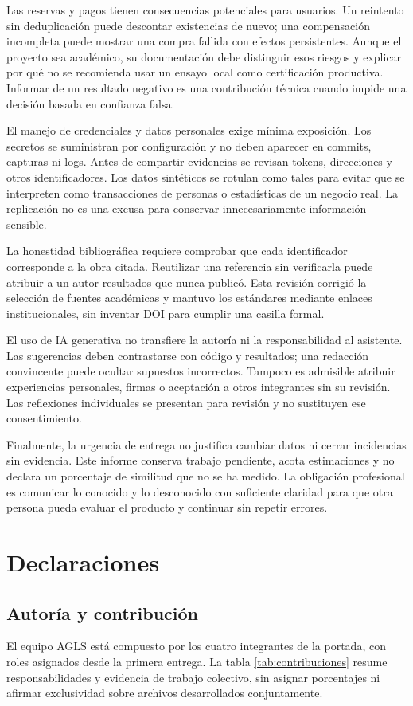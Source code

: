 \documentclass[12pt,a4paper]{article}
\newcommand{\seccion}[1]{\section{#1}}
\begin{document}
Las reservas y pagos tienen consecuencias potenciales para usuarios. Un reintento sin deduplicación puede descontar existencias de nuevo; una compensación incompleta puede mostrar una compra fallida con efectos persistentes. Aunque el proyecto sea académico, su documentación debe distinguir esos riesgos y explicar por qué no se recomienda usar un ensayo local como certificación productiva. Informar de un resultado negativo es una contribución técnica cuando impide una decisión basada en confianza falsa.

El manejo de credenciales y datos personales exige mínima exposición. Los secretos se suministran por configuración y no deben aparecer en commits, capturas ni logs. Antes de compartir evidencias se revisan tokens, direcciones y otros identificadores. Los datos sintéticos se rotulan como tales para evitar que se interpreten como transacciones de personas o estadísticas de un negocio real. La replicación no es una excusa para conservar innecesariamente información sensible.

La honestidad bibliográfica requiere comprobar que cada identificador corresponde a la obra citada. Reutilizar una referencia sin verificarla puede atribuir a un autor resultados que nunca publicó. Esta revisión corrigió la selección de fuentes académicas y mantuvo los estándares mediante enlaces institucionales, sin inventar DOI para cumplir una casilla formal.

El uso de IA generativa no transfiere la autoría ni la responsabilidad al asistente. Las sugerencias deben contrastarse con código y resultados; una redacción convincente puede ocultar supuestos incorrectos. Tampoco es admisible atribuir experiencias personales, firmas o aceptación a otros integrantes sin su revisión. Las reflexiones individuales se presentan para revisión y no sustituyen ese consentimiento.

Finalmente, la urgencia de entrega no justifica cambiar datos ni cerrar incidencias sin evidencia. Este informe conserva trabajo pendiente, acota estimaciones y no declara un porcentaje de similitud que no se ha medido. La obligación profesional es comunicar lo conocido y lo desconocido con suficiente claridad para que otra persona pueda evaluar el producto y continuar sin repetir errores.

\seccion{Declaraciones}
\subsection{Autoría y contribución}
El equipo AGLS está compuesto por los cuatro integrantes de la portada, con roles asignados desde la primera entrega. La tabla \ref{tab:contribuciones} resume responsabilidades y evidencia de trabajo colectivo, sin asignar porcentajes ni afirmar exclusividad sobre archivos desarrollados conjuntamente.
\end{document}
